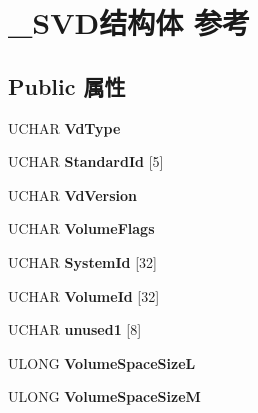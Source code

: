 \hypertarget{struct___s_v_d}{}\section{\+\_\+\+S\+V\+D结构体 参考}
\label{struct___s_v_d}
\subsection*{Public 属性}
\begin{DoxyCompactItemize}
\item 
\mbox{\label{struct___s_v_d_afe225c9f306acc0c16af2899ad777fd9}} 
U\+C\+H\+AR {\bfseries Vd\+Type}
\item 
\mbox{\label{struct___s_v_d_ae4650fcdc1d81f8e2b7ed14e28a79f43}} 
U\+C\+H\+AR {\bfseries Standard\+Id} \mbox{[}5\mbox{]}
\item 
\mbox{\label{struct___s_v_d_a49628d88d95f3d2d73e7ab19791200bd}} 
U\+C\+H\+AR {\bfseries Vd\+Version}
\item 
\mbox{\label{struct___s_v_d_a4660c28dae760566c220136a62149ff2}} 
U\+C\+H\+AR {\bfseries Volume\+Flags}
\item 
\mbox{\label{struct___s_v_d_a7e1231947aed48c639ffe8cbbca3b859}} 
U\+C\+H\+AR {\bfseries System\+Id} \mbox{[}32\mbox{]}
\item 
\mbox{\label{struct___s_v_d_a1d846227f6584859b2344cba338b2383}} 
U\+C\+H\+AR {\bfseries Volume\+Id} \mbox{[}32\mbox{]}
\item 
\mbox{\label{struct___s_v_d_a075fa16deab17924c3ad599cc3c343f0}} 
U\+C\+H\+AR {\bfseries unused1} \mbox{[}8\mbox{]}
\item 
\mbox{\label{struct___s_v_d_a8b2b563ee1afa070d7f5ebcb142096c0}} 
U\+L\+O\+NG {\bfseries Volume\+Space\+SizeL}
\item 
\mbox{\label{struct___s_v_d_af80f6f4b25b69056445baabcf1eb7cbe}} 
U\+L\+O\+NG {\bfseries Volume\+Space\+SizeM}
\item 
\mbox{\label{struct___s_v_d_af2fa38feb1c413c3e02333ce716145d2}} 

\end{DoxyCompactItemize}
